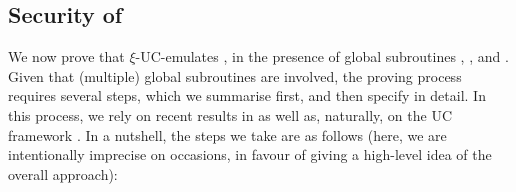 \subsection{Security of \RealPKIDIDAtala}
\label{ssec:sec-didatala}

We now prove that \RealPKIDIDAtala $\xi$-UC-emulates \IdealGPKIDID, in the
presence of global subroutines \IdealGclock, \IdealGRO, and \IdealGdledger.
Given that (multiple) global subroutines are involved, the proving process
requires several steps, which we summarise first, and then specify in detail. In
this process, we rely on recent results in \cite{bch+20,bhz21} as well as,
naturally, on the UC framework \cite{canetti00}. In a nutshell, the steps we
take are as follows (here, we are intentionally imprecise on occasions, in
favour of giving a high-level idea of the overall approach):


